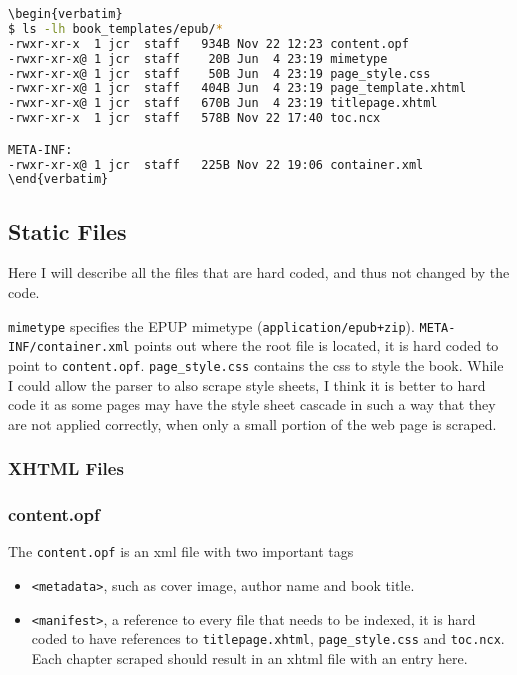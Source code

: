 \documentclass[]{report}   %
\begin{document}
\begin{lstlisting}[language=bash]
\begin{verbatim}
$ ls -lh book_templates/epub/*
-rwxr-xr-x  1 jcr  staff   934B Nov 22 12:23 content.opf
-rwxr-xr-x@ 1 jcr  staff    20B Jun  4 23:19 mimetype
-rwxr-xr-x@ 1 jcr  staff    50B Jun  4 23:19 page_style.css
-rwxr-xr-x@ 1 jcr  staff   404B Jun  4 23:19 page_template.xhtml
-rwxr-xr-x@ 1 jcr  staff   670B Jun  4 23:19 titlepage.xhtml
-rwxr-xr-x  1 jcr  staff   578B Nov 22 17:40 toc.ncx

META-INF:
-rwxr-xr-x@ 1 jcr  staff   225B Nov 22 19:06 container.xml
\end{verbatim}
\end{lstlisting}

\subsection{Static Files}
Here I will describe all the files that are hard coded, and thus not changed by the code.

\texttt{mimetype} specifies the EPUP mimetype (\texttt{application/epub+zip}).
\texttt{META-INF/container.xml} points out where the root file is located, it
is hard coded to point to \texttt{content.opf}. \texttt{page\_style.css}
contains the css to style the book. While I could allow the parser to also
scrape style sheets, I think it is better to hard code it as some pages may
have the style sheet cascade in such a way that they are not applied correctly,
when only a small portion of the web page is scraped.

\subsubsection{XHTML Files}

\subsubsection{content.opf}
The \texttt{content.opf} is an xml file with two important tags
\begin{itemize}
    \item \texttt{<metadata>}, such as cover image, author name and book title.
    \item \texttt{<manifest>}, a reference to every file that needs to be
        indexed, it is hard coded to have references to \texttt{titlepage.xhtml}, \texttt{page\_style.css} and \texttt{toc.ncx}. Each chapter scraped should result in an xhtml file with an entry here.
\end{itemize}
\end{document}
